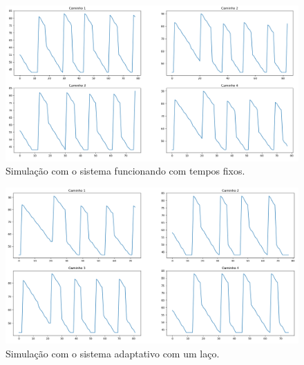 \begin{figure}[H]
    \begin{center}
    \includegraphics[width=1\textwidth]{figuras/Trip_Duration_With_TrafficLight.PNG}
    \end{center}
    \caption[Duração da viagem, cenário 2]{Simulação com o sistema funcionando com tempos fixos.}
    \label{tripWithTL}
\end{figure}

\begin{figure}[H]
    \begin{center}
    \includegraphics[width=1\textwidth]{figuras/Trip_Duration_With_One_Loop.PNG}
    \end{center}
    \caption[Duração da viagem, cenário 3]{Simulação com o sistema adaptativo com um laço.}
    \label{tripOneLoop}
\end{figure}

